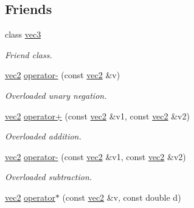 \subsection*{\-Friends}
\begin{DoxyCompactItemize}
\item 
\hypertarget{classutil_1_1math_1_1vec2_aa849243c6cd858bbcd88237a8ad16cad}{class \hyperlink{classutil_1_1math_1_1vec2_aa849243c6cd858bbcd88237a8ad16cad}{vec3}}\label{classutil_1_1math_1_1vec2_aa849243c6cd858bbcd88237a8ad16cad}

\begin{DoxyCompactList}\small\item\em \-Friend class. \end{DoxyCompactList}\item 
\hypertarget{classutil_1_1math_1_1vec2_a4a372204e9d4fbce7b21ba855dc5e567}{\hyperlink{classutil_1_1math_1_1vec2}{vec2} \hyperlink{classutil_1_1math_1_1vec2_a4a372204e9d4fbce7b21ba855dc5e567}{operator-\/} (const \hyperlink{classutil_1_1math_1_1vec2}{vec2} \&v)}\label{classutil_1_1math_1_1vec2_a4a372204e9d4fbce7b21ba855dc5e567}

\begin{DoxyCompactList}\small\item\em \-Overloaded unary negation. \end{DoxyCompactList}\item 
\hypertarget{classutil_1_1math_1_1vec2_a16e78f0abc6889e956835d00606a4fbd}{\hyperlink{classutil_1_1math_1_1vec2}{vec2} \hyperlink{classutil_1_1math_1_1vec2_a16e78f0abc6889e956835d00606a4fbd}{operator+} (const \hyperlink{classutil_1_1math_1_1vec2}{vec2} \&v1, const \hyperlink{classutil_1_1math_1_1vec2}{vec2} \&v2)}\label{classutil_1_1math_1_1vec2_a16e78f0abc6889e956835d00606a4fbd}

\begin{DoxyCompactList}\small\item\em \-Overloaded addition. \end{DoxyCompactList}\item 
\hypertarget{classutil_1_1math_1_1vec2_a5b94d4dd9df52ab156e5a65562f3e088}{\hyperlink{classutil_1_1math_1_1vec2}{vec2} \hyperlink{classutil_1_1math_1_1vec2_a5b94d4dd9df52ab156e5a65562f3e088}{operator-\/} (const \hyperlink{classutil_1_1math_1_1vec2}{vec2} \&v1, const \hyperlink{classutil_1_1math_1_1vec2}{vec2} \&v2)}\label{classutil_1_1math_1_1vec2_a5b94d4dd9df52ab156e5a65562f3e088}

\begin{DoxyCompactList}\small\item\em \-Overloaded subtraction. \end{DoxyCompactList}\item 
\hypertarget{classutil_1_1math_1_1vec2_a6aa3cf219cbdd3248b18830402caef79}{\hyperlink{classutil_1_1math_1_1vec2}{vec2} \hyperlink{classutil_1_1math_1_1vec2_a6aa3cf219cbdd3248b18830402caef79}{operator$\ast$} (const \hyperlink{classutil_1_1math_1_1vec2}{vec2} \&v, const double d)}\label{classutil_1_1math_1_1vec2_a6aa3cf219cbdd3248b18830402caef79}


\end{DoxyCompactItemize}
